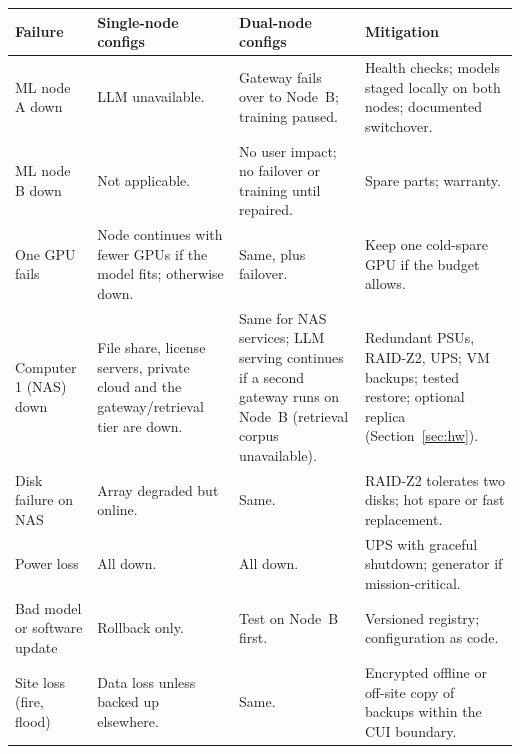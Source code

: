{\footnotesize
\begin{xltabular}{\textwidth}{@{}Y{0.8}Y{1.0}Y{1.0}Y{1.2}@{}}
  \toprule
  Failure & Single-node configs & Dual-node configs & Mitigation \\
  \midrule
  \endhead
  ML node A down & LLM unavailable. & Gateway fails over to Node~B; training paused. & Health checks; models staged locally on both nodes; documented switchover. \\
  ML node B down & Not applicable. & No user impact; no failover or training until repaired. & Spare parts; warranty. \\
  One GPU fails & Node continues with fewer GPUs if the model fits; otherwise down. & Same, plus failover. & Keep one cold-spare GPU if the budget allows. \\
  Computer 1 (NAS) down & File share, license servers, private cloud and the gateway/retrieval tier are down. & Same for NAS services; LLM serving continues if a second gateway runs on Node~B (retrieval corpus unavailable). & Redundant PSUs, RAID-Z2, UPS; VM backups; tested restore; optional replica (Section~\ref{sec:hw}). \\
  Disk failure on NAS & Array degraded but online. & Same. & RAID-Z2 tolerates two disks; hot spare or fast replacement. \\
  Power loss & All down. & All down. & UPS with graceful shutdown; generator if mission-critical. \\
  Bad model or software update & Rollback only. & Test on Node~B first. & Versioned registry; configuration as code. \\
  Site loss (fire, flood) & Data loss unless backed up elsewhere. & Same. & Encrypted offline or off-site copy of backups within the CUI boundary. \\
  \bottomrule
\end{xltabular}}


